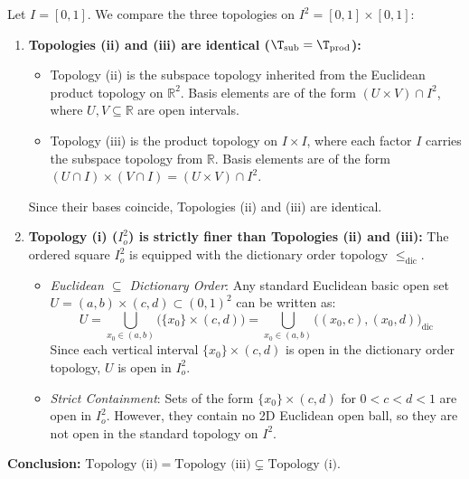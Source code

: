 
Let $I=[0,1]$. We compare the three topologies on $I^2=[0,1]\times[0,1]$:

\begin{enumerate}[label=\arabic*.]
  \item \textbf{Topologies (ii) and (iii) are identical
        ($\T_{\text{sub}}=\T_{\text{prod}}$):}
    \begin{itemize}
      \item Topology (ii) is the subspace topology inherited from the Euclidean product
            topology on $\mathbb{R}^2$. Basis elements are of the form $(U\times V)\cap I^2$,
            where $U,V\subseteq\mathbb{R}$ are open intervals.
      \item Topology (iii) is the product topology on $I\times I$, where each factor $I$
            carries the subspace topology from $\mathbb{R}$. Basis elements are of the form
            $(U\cap I)\times(V\cap I)=(U\times V)\cap I^2$.
    \end{itemize}
    Since their bases coincide, Topologies (ii) and (iii) are identical.

  \item \textbf{Topology (i) ($I_o^2$) is strictly finer than Topologies (ii) and (iii):}
    The ordered square $I_o^2$ is equipped with the dictionary order topology
    $\le_{\text{dic}}$.
    \begin{itemize}
      \item \emph{Euclidean $\subseteq$ Dictionary Order}: Any standard Euclidean basic open
            set $U=(a,b)\times(c,d)\subset(0,1)^2$ can be written as:
            \[ U=\bigcup_{x_0\in(a,b)}\Big(\{x_0\}\times(c,d)\Big)
                =\bigcup_{x_0\in(a,b)}\Big((x_0,c),(x_0,d)\Big)_{\text{dic}} \]
            Since each vertical interval $\{x_0\}\times(c,d)$ is open in the dictionary order
            topology, $U$ is open in $I_o^2$.
      \item \emph{Strict Containment}: Sets of the form $\{x_0\}\times(c,d)$ for
            $0<c<d<1$ are open in $I_o^2$. However, they contain no 2D Euclidean open ball,
            so they are not open in the standard topology on $I^2$.
    \end{itemize}
\end{enumerate}
\textbf{Conclusion:} $\text{Topology (ii)}=\text{Topology (iii)}\subsetneq\text{Topology (i)}$.

